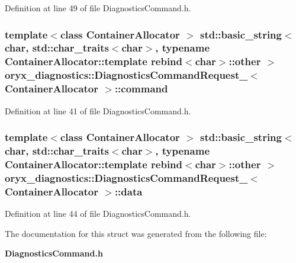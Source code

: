 \-Definition at line 49 of file \-Diagnostics\-Command.\-h.

\subsubsection[{command}]{\setlength{\rightskip}{0pt plus 5cm}template$<$class Container\-Allocator $>$ std\-::basic\-\_\-string$<$char, std\-::char\-\_\-traits$<$char$>$, typename \-Container\-Allocator\-::template rebind$<$char$>$\-::other $>$ {\bf oryx\-\_\-diagnostics\-::\-Diagnostics\-Command\-Request\-\_\-}$<$ \-Container\-Allocator $>$\-::{\bf command}}\label{structoryx__diagnostics_1_1DiagnosticsCommandRequest___a88b7ce59bc986210aae81197ca74564a}


\-Definition at line 41 of file \-Diagnostics\-Command.\-h.

\subsubsection[{data}]{\setlength{\rightskip}{0pt plus 5cm}template$<$class Container\-Allocator $>$ std\-::basic\-\_\-string$<$char, std\-::char\-\_\-traits$<$char$>$, typename \-Container\-Allocator\-::template rebind$<$char$>$\-::other $>$ {\bf oryx\-\_\-diagnostics\-::\-Diagnostics\-Command\-Request\-\_\-}$<$ \-Container\-Allocator $>$\-::{\bf data}}\label{structoryx__diagnostics_1_1DiagnosticsCommandRequest___ae53e76725d0ee5b2bd13e3fb65959322}


\-Definition at line 44 of file \-Diagnostics\-Command.\-h.



\-The documentation for this struct was generated from the following file\-:\begin{DoxyCompactItemize}
\item 
{\bf \-Diagnostics\-Command.\-h}\end{DoxyCompactItemize}
